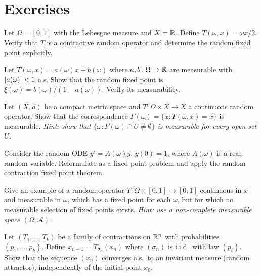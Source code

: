 \section{Exercises}

\begin{exercise}
Let $\Omega = [0,1]$ with the Lebesgue measure and $X = \mathbb{R}$. Define
$T(\omega, x) = \omega x / 2$. Verify that $T$ is a contractive random operator and
determine the random fixed point explicitly.
\end{exercise}

\begin{exercise}
Let $T(\omega, x) = a(\omega) x + b(\omega)$ where $a, b\colon \Omega \to \mathbb{R}$ are
measurable with $\left| a(\omega) \right| < 1$ a.s. Show that the random fixed point is
$\xi(\omega) = b(\omega) / (1 - a(\omega))$. Verify its measurability.
\end{exercise}

\begin{exercise}
Let $(X, d)$ be a compact metric space and $T\colon \Omega \times X \to X$ a continuous
random operator. Show that the correspondence $F(\omega) = \{x : T(\omega, x) = x\}$ is
measurable.
\emph{Hint: show that $\{\omega : F(\omega) \cap U \neq \emptyset\}$ is measurable for
every open set $U$.}
\end{exercise}

\begin{exercise}
Consider the random ODE $y' = A(\omega) y$, $y(0) = 1$, where $A(\omega)$ is a real
random variable. Reformulate as a fixed point problem and apply the random contraction
fixed point theorem.
\end{exercise}

\begin{exercise}
Give an example of a random operator $T\colon \Omega \times [0,1] \to [0,1]$ continuous
in $x$ and measurable in $\omega$, which has a fixed point for each $\omega$, but for
which no measurable selection of fixed points exists.
\emph{Hint: use a non-complete measurable space $(\Omega, \mathcal{A})$.}
\end{exercise}

\begin{exercise}
Let $(T_1, \ldots, T_k)$ be a family of contractions on $\mathbb{R}^n$ with probabilities
$(p_1, \ldots, p_k)$. Define $x_{n+1} = T_{\sigma_n}(x_n)$ where $(\sigma_n)$ is i.i.d.\
with law $(p_i)$. Show that the sequence $(x_n)$ converges a.s.\ to an invariant measure
(random attractor), independently of the initial point $x_0$.
\end{exercise}
